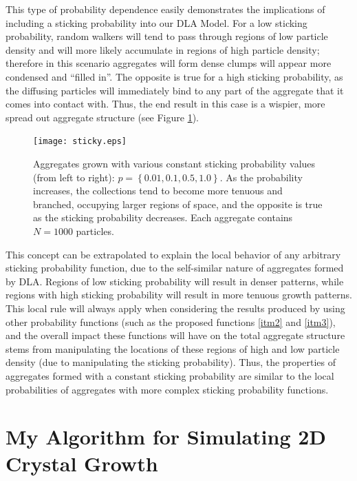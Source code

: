 \documentclass{article}
\begin{document}
This type of probability dependence easily demonstrates the implications of including a sticking probability into our DLA Model. For a low sticking probability, random walkers will tend to pass through regions of low particle density and will more likely accumulate in regions of high particle density; therefore in this scenario aggregates will form dense clumps will appear more condensed and ``filled in''. The opposite is true for a high sticking probability, as the diffusing particles will immediately bind to any part of the aggregate that it comes into contact with. Thus, the end result in this case is a wispier, more spread out aggregate structure (see Figure \ref{sticky}). 

\begin{figure}[ht!]
\begin{center}
	\texttt{[image: sticky.eps]}
	\caption{Aggregates grown with various constant sticking probability values (from left to right): $p = \left\{ 0.01, 0.1, 0.5, 1.0 \right\}$. As the probability increases, the collections tend to become more tenuous and branched, occupying larger regions of space, and the opposite is true as the sticking probability decreases. Each aggregate contains $N=1000$ particles.}
	\label{sticky}
\end{center}
\end{figure}

This concept can be extrapolated to explain the local behavior of any arbitrary sticking probability function, due to the self-similar nature of aggregates formed by DLA. Regions of low sticking probability will result in denser patterns, while regions with high sticking probability will result in more tenuous growth patterns. This local rule will always apply when considering the results produced by using other probability functions (such as the proposed functions \ref{itm2} and \ref{itm3}), and the overall impact these functions will have on the total aggregate structure stems from manipulating the locations of these regions of high and low particle density (due to manipulating the sticking probability). Thus, the properties of aggregates formed with a constant sticking probability are similar to the local probabilities of aggregates with more complex sticking probability functions. 



\section{My Algorithm for Simulating 2D Crystal Growth}
\end{document}
